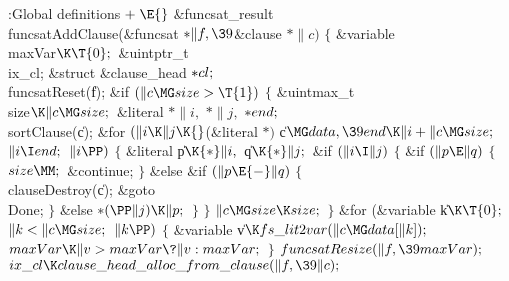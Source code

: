 \Y\B\4:Global definitions\X${}\mathrel+\E{}$\6
\&{funcsat\_result} \\{funcsatAddClause}(\&{funcsat} ${}{*}\|f,\39{}$\&{clause}
${}{*}\|c){}$\1\1\2\2\6
${}\{{}$\1\6
\&{variable} \\{maxVar}${}\K\T{0};{}$\6
\&{uintptr\_t} \\{ix\_cl};\6
\&{struct} \&{clause\_head} ${}{*}\\{cl};{}$\7
\\{funcsatReset}(\|f);\6
\&{if} ${}(\|c\MG\\{size}>\T{1}){}$\5
${}\{{}$\1\6
\&{uintmax\_t} \\{size}${}\K\|c\MG\\{size};{}$\6
\&{literal} ${}{*}\|i,{}$ ${}{*}\|j,{}$ ${}{*}\\{end};{}$\7
\\{sortClause}(\|c);\6
\&{for} ${}(\|i\K\|j\K{}$(\&{literal} ${}{*}){}$ \|c${}\MG\\{data},\39\\{end}\K%
\|i+\|c\MG\\{size};{}$ ${}\|i\I\\{end};{}$ ${}\|i\PP){}$\5
${}\{{}$\1\6
\&{literal} \|p${}\K{*}\|i,{}$ \|q${}\K{*}\|j;{}$\7
\&{if} ${}(\|i\I\|j){}$\5
${}\{{}$\1\6
\&{if} ${}(\|p\E\|q){}$\5
${}\{{}$\1\6
${}\\{size}\MM;{}$\6
\&{continue};\6
\4${}\}{}$\2\6
\&{else} \&{if} ${}(\|p\E{-}\|q){}$\5
${}\{{}$\1\6
\\{clauseDestroy}(\|c);\6
\&{goto} \\{Done};\6
\4${}\}{}$\2\6
\&{else}\1\5
${}{*}(\PP\|j)\K\|p;{}$\2\6
\4${}\}{}$\2\6
\4${}\}{}$\2\6
${}\|c\MG\\{size}\K\\{size};{}$\6
\4${}\}{}$\2\6
\&{for} (\&{variable} \|k${}\K\T{0};{}$ ${}\|k<\|c\MG\\{size};{}$ ${}\|k\PP){}$%
\5
${}\{{}$\1\6
\&{variable} \|v${}\K\\{fs\_lit2var}(\|c\MG\\{data}[\|k]);{}$\7
${}\\{maxVar}\K\|v>\\{maxVar}\?\|v:\\{maxVar};{}$\6
\4${}\}{}$\2\6
${}\\{funcsatResize}(\|f,\39\\{maxVar});{}$\6
${}\\{ix\_cl}\K\\{clause\_head\_alloc\_from\_clause}(\|f,\39\|c);{}$\6
